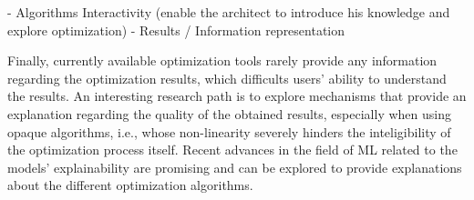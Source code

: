 	- Algorithms Interactivity (enable the architect to introduce his knowledge and explore optimization)
	- Results / Information representation
	
	Finally, currently available optimization tools rarely provide any information regarding the optimization results, which difficults users' ability to understand the results. An interesting research path is to explore mechanisms that provide an explanation regarding the quality of the obtained results, especially when using opaque algorithms, i.e., whose non-linearity severely hinders the inteligibility of the optimization process itself. Recent advances in the field of \ac{ML} related to the models' explainability are promising and can be explored to provide explanations about the different optimization algorithms. 
	
	
	
	
	